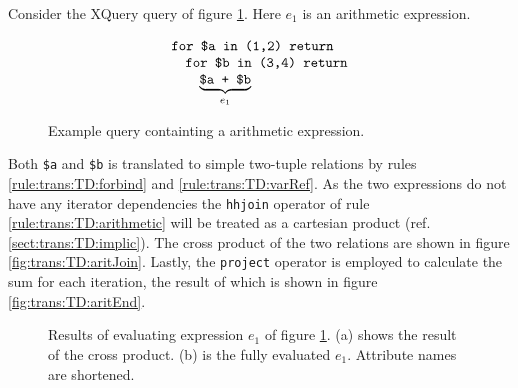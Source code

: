 \begin{myExample}
Consider the XQuery query of figure \ref{fig:trans:TD:arithQuery}. Here $e_1$ is an arithmetic expression.

\begin{figure}[h]
\centering
\begin{equation*}
\begin{array}{l}
\mbox{\texttt{for \$a in (1,2) return}} \\ \quad
\mbox{\texttt{for \$b in (3,4) return}} \\ \quad \quad
\underbrace{\mbox{\texttt{\$a + \$b}}}_{e_1}
\end{array}
\end{equation*}
\caption{Example query containting a arithmetic expression.}
\label{fig:trans:TD:arithQuery}
\end{figure}

Both \texttt{\$a} and \texttt{\$b} is translated to simple two-tuple relations by rules
\ref{rule:trans:TD:forbind} and \ref{rule:trans:TD:varRef}. As the two expressions do not have any iterator
dependencies the \texttt{hhjoin} operator of rule \ref{rule:trans:TD:arithmetic} will be treated as a cartesian
product (ref. \ref{sect:trans:TD:implic}). The cross product of the two relations are shown in figure
\ref{fig:trans:TD:aritJoin}. Lastly, the \texttt{project} operator is employed to calculate the sum for each
iteration, the result of which is shown in figure \ref{fig:trans:TD:aritEnd}.

\begin{figure}[h]
\centering
{}
\qquad
{}
\caption[Results of evaluating expression $e_1$ of figure \ref{fig:trans:TD:arithQuery}.]{Results of evaluating
expression $e_1$ of figure \ref{fig:trans:TD:arithQuery}. (a) shows the result of the cross product. (b) is the
fully evaluated $e_1$. Attribute names are shortened. \label{fig:trans:TD:arithRes}}
\end{figure}

\end{myExample}

